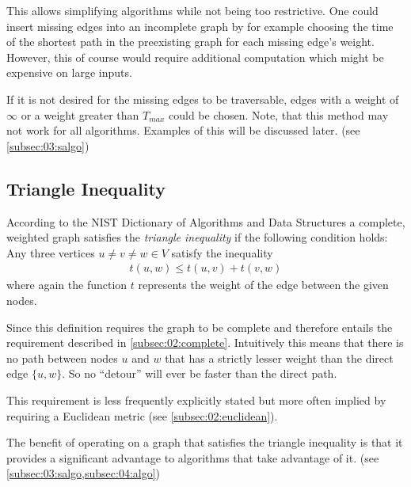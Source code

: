 This allows simplifying algorithms while not being too restrictive.
One could insert missing edges into an incomplete graph by for example choosing the time of the shortest path in the preexisting graph for each missing edge's weight.
However, this of course would require additional computation which might be expensive on large inputs.

If it is not desired for the missing edges to be traversable,
edges with a weight of $\infty$ or a weight greater than $T_{max}$ could be chosen.
Note, that this method may not work for all algorithms. Examples of this will be discussed later. (see \cref{subsec:03:salgo})

\subsection{Triangle Inequality}
\label{subsec:02:triangle}

According to the NIST Dictionary of Algorithms and Data Structures \cite{black_triangle_2004} a complete,
weighted graph satisfies the \emph{triangle inequality} if the following condition holds:
Any three vertices $u \neq v \neq w \in V$ satisfy the inequality
\begin{align*}
	t(u, w) \leq t(u, v) + t(v, w)
\end{align*}
where again the function $t$ represents the weight of the edge between the given nodes.

Since this definition requires the graph to be complete and therefore entails the requirement described in \cref{subsec:02:complete}.
Intuitively this means that there is no path between nodes $u$ and $w$ that has a strictly lesser weight
than the direct edge $\{u, w\}$. So no \enquote{detour} will ever be faster than the direct path.

This requirement is less frequently explicitly stated \cite{santini_hazardous_2022} but more often implied by requiring a Euclidean metric (see \cref{subsec:02:euclidean}).

The benefit of operating on a graph that satisfies the triangle inequality
is that it provides a significant advantage to algorithms that take advantage of it.
(see \cref{subsec:03:salgo,subsec:04:algo})

